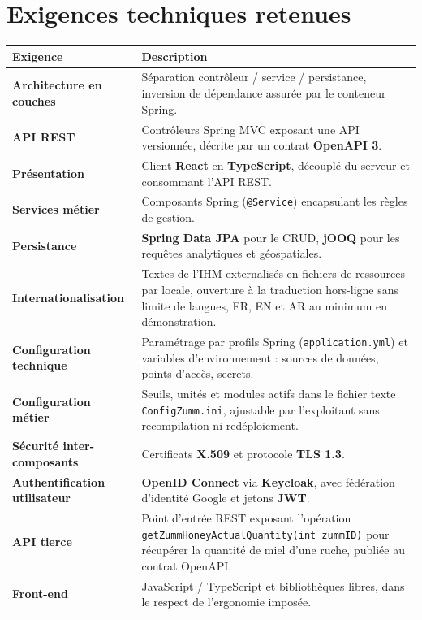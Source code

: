 \section{Exigences techniques retenues}
\begin{xltabular}{\textwidth}{>{\bfseries}p{4cm} X}
\toprule
\textbf{Exigence} & \textbf{Description} \\
\midrule
\endhead
Architecture en couches & Séparation contrôleur / service / persistance, inversion de dépendance assurée par le conteneur Spring. \\
API REST & Contrôleurs Spring MVC exposant une API versionnée, décrite par un contrat \textbf{OpenAPI 3}. \\
Présentation & Client \textbf{React} en \textbf{TypeScript}, découplé du serveur et consommant l'API REST. \\
Services métier & Composants Spring (\texttt{@Service}) encapsulant les règles de gestion. \\
Persistance & \textbf{Spring Data JPA} pour le CRUD, \textbf{jOOQ} pour les requêtes analytiques et géospatiales. \\
Internationalisation & Textes de l'IHM externalisés en fichiers de ressources par locale, ouverture à la traduction hors-ligne sans limite de langues, FR, EN et AR au minimum en démonstration. \\
Configuration technique & Paramétrage par profils Spring (\texttt{application.yml}) et variables d'environnement : sources de données, points d'accès, secrets. \\
Configuration métier & Seuils, unités et modules actifs dans le fichier texte \texttt{ConfigZumm.ini}, ajustable par l'exploitant sans recompilation ni redéploiement. \\
Sécurité inter-composants & Certificats \textbf{X.509} et protocole \textbf{TLS 1.3}. \\
Authentification utilisateur & \textbf{OpenID Connect} via \textbf{Keycloak}, avec fédération d'identité Google et jetons \textbf{JWT}. \\
API tierce       & Point d'entrée REST exposant l'opération \texttt{getZummHoneyActualQuantity(int zummID)} pour récupérer la quantité de miel d'une ruche, publiée au contrat OpenAPI. \\
Front-end        & JavaScript / TypeScript et bibliothèques libres, dans le respect de l'ergonomie imposée. \\
\bottomrule
\end{xltabular}

